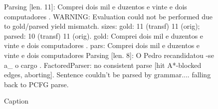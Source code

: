 \begin{figure}
    \centering
    Parsing [len. 11]: Comprei dois mil e duzentos e vinte e dois computadores .
WARNING: Evaluation could not be performed due to gold/parsed yield mismatch.
sizes: gold: 11 (transf) 11 (orig); parsed: 10 (transf) 11 (orig).
gold: Comprei dois mil e duzentos e vinte e dois computadores .
pars: Comprei dois mil e duzentos e vinte e dois computadores
Parsing [len. 8]: O Pedro recandidatou -se a_ o cargo .
FactoredParser: no consistent parse [hit A*-blocked edges, aborting].
Sentence couldn't be parsed by grammar.... falling back to PCFG parse.
    \caption{Caption}
    \label{fig:my_label}
\end{figure}